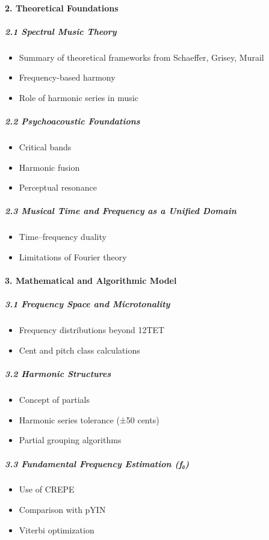 \paragraph{2. Theoretical Foundations}

\subparagraph{2.1 Spectral Music Theory}
\begin{itemize}
    \item Summary of theoretical frameworks from Schaeffer, Grisey, Murail
    \item Frequency-based harmony
    \item Role of harmonic series in music
\end{itemize}

\subparagraph{2.2 Psychoacoustic Foundations}
\begin{itemize}
    \item Critical bands
    \item Harmonic fusion
    \item Perceptual resonance
\end{itemize}

\subparagraph{2.3 Musical Time and Frequency as a Unified Domain}
\begin{itemize}
    \item Time–frequency duality
    \item Limitations of Fourier theory
\end{itemize}

\paragraph{3. Mathematical and Algorithmic Model}

\subparagraph{3.1 Frequency Space and Microtonality}
\begin{itemize}
    \item Frequency distributions beyond 12TET
    \item Cent and pitch class calculations
\end{itemize}

\subparagraph{3.2 Harmonic Structures}
\begin{itemize}
    \item Concept of partials
    \item Harmonic series tolerance (±50 cents)
    \item Partial grouping algorithms
\end{itemize}

\subparagraph{3.3 Fundamental Frequency Estimation (f₀)}
\begin{itemize}
    \item Use of CREPE
    \item Comparison with pYIN
    \item Viterbi optimization
\end{itemize}

